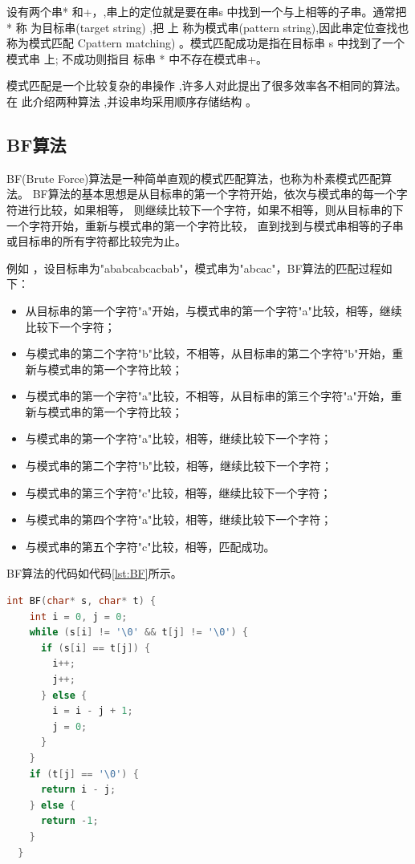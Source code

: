 \documentclass[lang=cn,newtx,10pt,scheme=chinese]{../elegantbook}
\begin{document}
设有两个串* 和+，,串上的定位就是要在串s 中找到一个与上相等的子串。通常把 * 称
为目标串(target string) ,把 上 称为模式串(pattern string),因此串定位查找也称为模式匹配
Cpattern matching) 。模式匹配成功是指在目标串 s 中找到了一个模式串 上; 不成功则指目
标串 * 中不存在模式串+。

模式匹配是一个比较复杂的串操作 ,许多人对此提出了很多效率各不相同的算法。在
此介绍两种算法 ,并设串均采用顺序存储结构 。

\subsection{BF算法}

BF(Brute Force)算法是一种简单直观的模式匹配算法，也称为朴素模式匹配算法。
BF算法的基本思想是从目标串的第一个字符开始，依次与模式串的每一个字符进行比较，如果相等，
则继续比较下一个字符，如果不相等，则从目标串的下一个字符开始，重新与模式串的第一个字符比较，
直到找到与模式串相等的子串或目标串的所有字符都比较完为止。

例如 ，设目标串为"ababcabcacbab"，模式串为"abcac"，BF算法的匹配过程如下：

\begin{itemize}
  \item 从目标串的第一个字符"a"开始，与模式串的第一个字符"a"比较，相等，继续比较下一个字符；
  \item 与模式串的第二个字符"b"比较，不相等，从目标串的第二个字符"b"开始，重新与模式串的第一个字符比较；
  \item 与模式串的第一个字符"a"比较，不相等，从目标串的第三个字符"a"开始，重新与模式串的第一个字符比较；
  \item 与模式串的第一个字符"a"比较，相等，继续比较下一个字符；
  \item 与模式串的第二个字符"b"比较，相等，继续比较下一个字符；
  \item 与模式串的第三个字符"c"比较，相等，继续比较下一个字符；
  \item 与模式串的第四个字符"a"比较，相等，继续比较下一个字符；
  \item 与模式串的第五个字符"c"比较，相等，匹配成功。
\end{itemize}

BF算法的代码如代码\ref{lst:BF}所示。

\begin{lstlisting}[language=C++, caption={BF算法示例代码}, label={lst:BF}]
  int BF(char* s, char* t) {
    int i = 0, j = 0;
    while (s[i] != '\0' && t[j] != '\0') {
      if (s[i] == t[j]) {
        i++;
        j++;
      } else {
        i = i - j + 1;
        j = 0;
      }
    }
    if (t[j] == '\0') {
      return i - j;
    } else {
      return -1;
    }
  }

\end{lstlisting}
\end{document}
